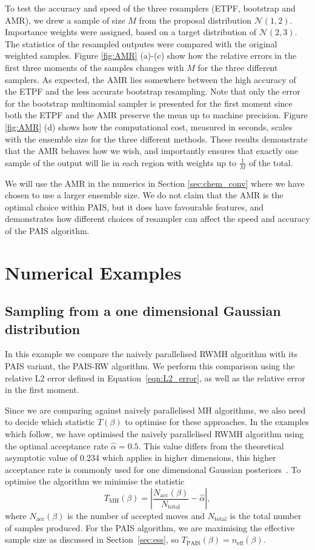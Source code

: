 \documentclass[final]{siamltex}
\newcommand{\neff}{n_{\text{eff}}}
\begin{document}
To test the accuracy and speed of the three resamplers (ETPF,
bootstrap and AMR), we drew a sample of size $M$ from the proposal distribution
$\mathcal{N}(1,2)$. Importance weights were assigned, based on a
target distribution of $\mathcal{N}(2,3)$. The statistics of the
resampled outputes were compared with the original weighted samples. Figure \ref{fig:AMR} (a)-(c) show how the relative errors in the first
three moments of the samples changes with $M$ for the three different
samplers. As expected, the AMR lies somewhere between the high
accuracy of the ETPF and the less accurate bootstrap
resampling. Note that only the error for the bootstrap multinomial
sampler is presented for the first moment since both the ETPF and the
AMR preserve the mean up to machine precision. Figure \ref{fig:AMR} (d) shows how the computational cost,
measured in seconds, scales with the ensemble size for the three
different methods. These results demonstrate that the AMR behaves how we wish, and
importantly ensures that exactly one sample of the output will lie in
each region with weights up to $\frac{1}{M}$ of the total.

We will use the AMR in the numerics in Section \ref{sec:chem_conv}
where we have chosen to use a larger ensemble size. We do not claim
that the AMR is the optimal choice within PAIS, but it does have
favourable features, and demonstrates how different choices of
resampler can affect the speed and accuracy of the PAIS algorithm.

\section{Numerical Examples}\label{Sec:Num}

\subsection{Sampling from a one dimensional Gaussian distribution}\label{sec:problem 1}

In this example we compare the naively parallelised RWMH algorithm with its
PAIS variant, the PAIS-RW algorithm. We perform this comparison using the relative L2 error defined in Equation~\ref{eqn:L2_error}, as well as the relative error in the first moment.


Since we are comparing against naively parallelised MH algorithms,
we also need to decide which statistic $T(\beta)$ to optimise for
these approaches. In the examples which follow, we have optimised the naively parallelised RWMH algorithm using the optimal acceptance rate $\hat{\alpha} = 0.5$. This value differs from the theoretical asymptotic value of 0.234 which applies in higher dimensions, this higher acceptance rate is commonly used for one dimensional Gaussian posteriors~\cite{rosenthal2011optimal}. To optimise the algorithm we minimise the statistic
\[
	T_{\text{MH}}(\beta) = \left| \frac{N_{\text{acc}}(\beta)}{N_{\text{total}}} - \hat{\alpha} \right|,
\]
where $N_{\text{acc}}(\beta)$ is the number of accepted moves and
$N_{\text{total}}$ is the total number of samples produced. For the
PAIS algorithm, we are maximising the effective sample size as
discussed in Section~\ref{sec:ess}, so $T_{\text{PAIS}}(\beta) =
\neff(\beta)$.
\end{document}
